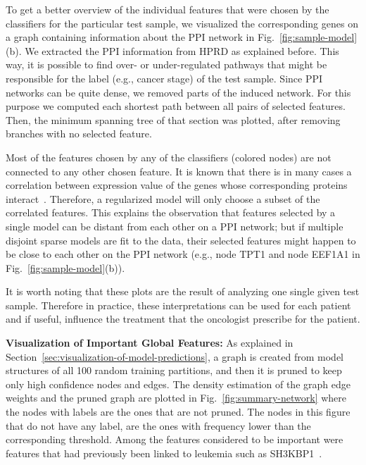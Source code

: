 To get a better overview of the individual features that were chosen by the classifiers for the particular test sample, we visualized the corresponding genes on a graph containing information about the PPI network in Fig.~\ref{fig:sample-model}(b). We extracted the PPI information from HPRD as explained before. This way, it is possible to find over- or under-regulated pathways that might be responsible for the label (e.g., cancer stage) of the test sample. Since PPI networks can be quite dense, we removed parts of the induced network. For this purpose we computed each shortest path between all pairs of selected features. Then, the minimum spanning tree of that section was plotted, after removing branches with no selected feature.

Most of the features chosen by any of the classifiers (colored nodes) are not connected to any other chosen feature. It is known that there is in many cases a correlation between expression value of the genes whose corresponding proteins interact~\cite{jansen2002relating}.
Therefore, a regularized model will only choose a subset of the correlated features. This explains the observation that features selected by a single model can be distant from each other on a PPI network; but if multiple disjoint sparse models are fit to the data, their selected features might happen to be close to each other on the PPI network (e.g., node TPT1 and node EEF1A1 in Fig.~\ref{fig:sample-model}(b)).

It is worth noting that these plots are the result of analyzing one single given test sample. Therefore in practice, these interpretations can be used for each patient and if useful, influence the treatment that the oncologist prescribe for the patient.


\textbf{Visualization of Important Global Features:}
As explained in Section~\ref{sec:visualization-of-model-predictions}, a graph is created from model structures of all 100 random training partitions, and then it is pruned to keep only high confidence nodes and edges.
The density estimation of the graph edge weights and the pruned graph are plotted in Fig.~\ref{fig:summary-network} where the nodes with labels are the ones that are not pruned. The nodes in this figure that do not have any label, are the ones with frequency lower than the corresponding threshold. Among the features considered to be important were features that had previously been linked to leukemia such as SH3KBP1~\cite{Adelaide2010}.

